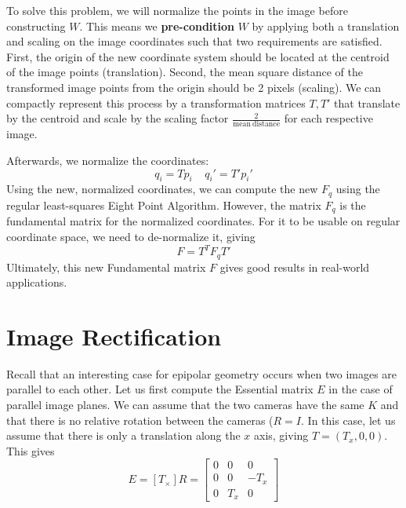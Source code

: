 \documentclass[a4paper, 12pt]{article}
\renewcommand\emph{\textbf}
\begin{document}
To solve this problem, we will normalize the points in the image before constructing $W$. This means we \emph{pre-condition} $W$ by applying both a translation and scaling on the image coordinates such that two requirements are satisfied. First, the origin of the new coordinate system should be located at the centroid of the image points (translation). Second, the mean square distance of the transformed image points from the origin should be 2 pixels (scaling). We can compactly represent this process by a transformation matrices $T, T'$ that translate by the centroid and scale by the scaling factor $\frac{2}{\mathrm{mean\ distance}}$ for each respective image.

Afterwards, we normalize the coordinates:
\begin{equation}
q_i = Tp_i \ \ \ \ \ q_i' = T'p_i'
\end{equation}
Using the new, normalized coordinates, we can compute the new $F_q$ using the regular least-squares Eight Point Algorithm. However, the matrix $F_q$ is the fundamental matrix for the normalized coordinates. For it to be usable on regular coordinate space, we need to de-normalize it, giving
\begin{equation}
F = T^TF_qT'
\end{equation}
Ultimately, this new Fundamental matrix $F$ gives good results in real-world applications.

\section{Image Rectification}

Recall that an interesting case for epipolar geometry occurs when two images are parallel to each other. Let us first compute the Essential matrix $E$ in the case of parallel image planes. We can assume that the two cameras have the same $K$ and that there is no relative rotation between the cameras ($R= I$. In this case, let us assume that there is only a translation along the $x$ axis, giving $T = (T_x, 0, 0)$. This gives
\begin{equation}
E = [T_\times] R = \begin{bmatrix} 0 & 0 & 0\\ 0 & 0 & -T_x \\ 0 & T_x  & 0 \end{bmatrix}
\end{equation}
\end{document}
